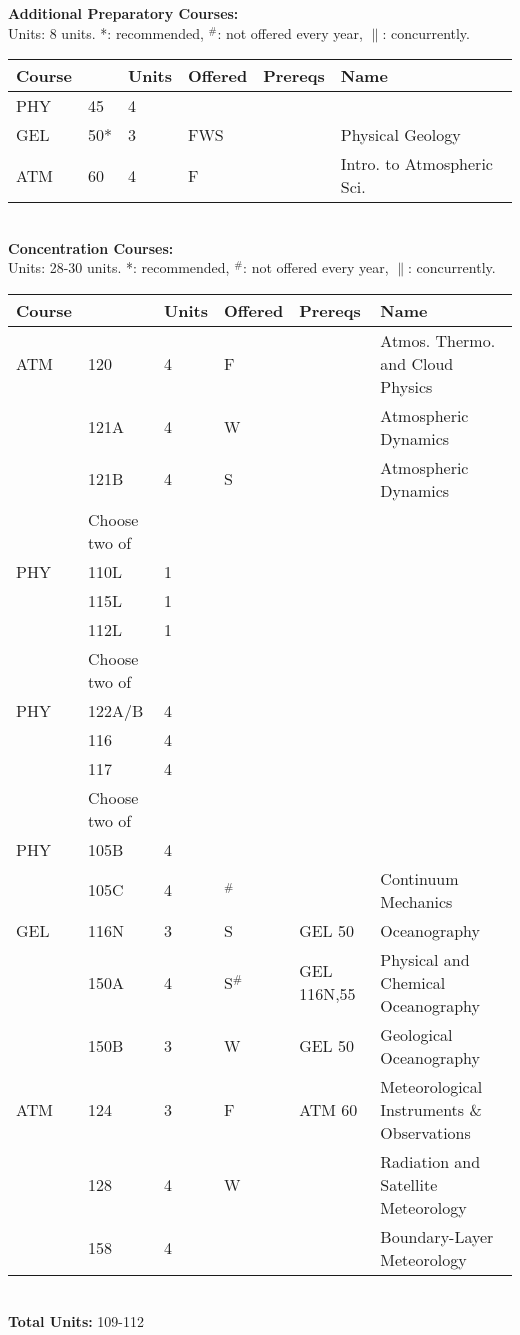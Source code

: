 \documentclass[12pt]{article}
\begin{document}
\newpage
{}
\vskip 0.25cm
\noindent
{\bf Additional Preparatory Courses:  }\\
Units:  8 units. *: recommended, $^\#$: not offered every year, $\parallel$: concurrently.\\
\begin{tabular}{|llllll|}
\hline
Course & & Units & Offered & Prereqs & Name \\
\hline
PHY & 45     & 4 &     & & \\
GEL & 50*    & 3 & FWS & & Physical Geology \\
ATM & 60     & 4 & F   & & Intro. to Atmospheric Sci. \\
\hline
\end{tabular}\\
\vskip 0.25cm
\noindent
{\bf Concentration Courses:  }\\
Units:  28-30 units. *: recommended, $^\#$: not offered every year, $\parallel$: concurrently.\\
\begin{tabular}{|llllll|}
\hline
Course & & Units & Offered & Prereqs & Name \\
\hline
ATM & 120    & 4 & F   & & Atmos. Thermo. and Cloud Physics \\
    & 121A   & 4 & W   & & Atmospheric Dynamics \\
    & 121B   & 4 & S   & & Atmospheric Dynamics \\
\hline
    & Choose two of & & & & \\
\hline
PHY & 110L & 1 & & & \\
    & 115L & 1 & & & \\
    & 112L & 1 & & & \\
\hline
\hline
    & Choose two of & & & & \\
\hline
PHY & 122A/B & 4 & & & \\
    & 116   & 4 & & & \\
    & 117   & 4 & & & \\
\hline
\hline
    & Choose two of & & & & \\
\hline
PHY  & 105B   & 4 & & & \\
     & 105C   & 4 & $^\#$  &             & Continuum Mechanics\\
GEL  & 116N   & 3 & S  & GEL 50      & Oceanography\\
     & 150A   & 4 & S$^\#$ & GEL 116N,55 & Physical and Chemical Oceanography\\
     & 150B   & 3 & W  & GEL 50      & Geological Oceanography\\
ATM  & 124    & 3 & F  & ATM 60      & Meteorological Instruments \& Observations \\
     & 128    & 4 & W  &             & Radiation and Satellite Meteorology \\
     & 158    & 4 &    &             & Boundary-Layer Meteorology \\
\hline
\end{tabular}\\
\vskip 0.25cm
\noindent
{\bf Total Units:} 109-112 \\
\end{document}

